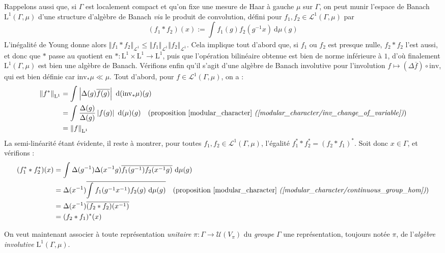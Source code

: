 \documentclass[a4paper,12pt]{article}
\newcommand{\norm}[1]{\left\Vert #1\right\Vert}
\newcommand{\abs}[1]{\left\vert#1\right\vert}
\newcommand{\integral}[4]{\int_{#1}^{#2} #3~\mathrm{d}#4}
\newcommand{\inv}{^{-1}}
\newcommand{\comp}{\circ}
\newcommand{\invop}{\mathrm{inv}}
\begin{document}
Rappelons aussi que, si $\Gamma$ est localement compact et qu'on fixe une mesure de Haar à gauche $\mu$ sur 
$\Gamma$, on peut munir l'espace de Banach $\mathrm{L}^1(\Gamma, \mu)$ d'une structure d'algèbre de Banach \emph{via}
le produit de convolution, défini pour $f_1, f_2\in\mathscr{L}^1(\Gamma, \mu)$ par 
\begin{equation*}
    (f_1\ast f_2)(x) := \integral{}{}{f_1(g)f_2(g\inv x)}{\mu(g)}
\end{equation*}
L'inégalité de Young donne alors $\norm{f_1\ast f_2}_{\mathscr{L}^1} \le \norm{f_1}_{\mathscr{L}^1}\norm{f_2}_{\mathscr{L}^1}$.
Cela implique tout d'abord que, si $f_1$ ou $f_2$ est presque nulle, $f_2\ast f_2$ l'est aussi, et donc que
$\ast$ passe au quotient en $\ast : \mathrm{L}^1 \times\mathrm{L}^1 \to \mathrm{L}^1$, puis que l'opération 
bilinéaire obtenue est bien de norme inférieure à $1$, d'où finalement $\mathrm{L}^1(\Gamma, \mu)$ est bien une algèbre de Banach.
Vérifions enfin qu'il s'agit d'une algèbre de Banach involutive pour l'involution $f\mapsto(\Delta\overline{f})\comp\invop$, qui est bien définie car 
$\invop_*\mu\ll\mu$. Tout d'abord, pour $f\in\mathscr{L}^1(\Gamma, \mu)$, on a : 
\begin{align*}
    \norm{f^*}_{\mathrm{L}^1} 
        &= \integral{}{}{\abs{\Delta(g)\overline{f(g)}}}{(\invop_*\mu)(g)} \\
        &= \integral{}{}{\frac{\Delta(g)}{\Delta(g)}\abs{f(g)}}{(\mu)(g)} \quad\text{(proposition \ref{modular_character} \textit{(\ref{modular_character/inv_change_of_variable})})}\\
        &= \norm{f}_{\mathrm{L}^1}
\end{align*}
La semi-linéarité étant évidente, il reste à montrer, pour toutes $f_1, f_2\in\mathscr{L}^1(\Gamma, \mu)$, l'égalité $f_1^*\ast f_2^* = (f_2\ast f_1)^*$. Soit donc $x\in\Gamma$, et vérifions :
\begin{align*}
    (f_1^*\ast f_2^*)(x) 
        &= \integral{}{}{\Delta(g\inv)\Delta(x\inv g)\overline{f_1(g\inv) f_2(x\inv g)}}{\mu(g)} \\
        &= \Delta(x\inv)\overline{\integral{}{}{f_1(g\inv x\inv) f_2(g)}{\mu(g)}} \quad\text{(proposition \ref{modular_character} \textit{(\ref{modular_character/continuous_group_hom})})}\\
        &= \Delta(x\inv)\overline{(f_2\ast f_2)(x\inv)} \\
        &= (f_2\ast f_1)^*(x)
\end{align*}

On veut maintenant associer à toute représentation \emph{unitaire} $\pi : \Gamma\to\mathcal{U}(V_\pi)$ du \emph{groupe} $\Gamma$ une
représentation, toujours notée $\pi$, de l'\emph{algèbre involutive} $\mathrm{L}^1(\Gamma, \mu)$.
\end{document}
